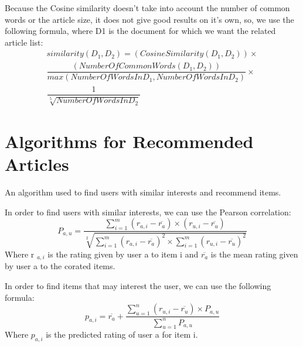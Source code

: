 \begin{enumerate}
		Because the Cosine similarity doesn’t take into account the number of common words or the article size, it does not give good results on it’s own, so, we use the following formula, where D1 is the document for which we want the related article list:
		\begin{equation}
			\begin{split}
				similarity(D_{1},D_{2}) = (Cosine Similarity(D_{1}, D_{2})) \times \\
				\dfrac {(Number Of Common Words(D_{1}, D_{2}))} {max(Number Of Words In D_{1}, Number Of Words In D_{2})} \times \\
				\dfrac {1} {\sqrt[5] {Number Of Words In D_{2}}}
			\end{split}
		\end{equation}

\end{enumerate}


\section{Algorithms for Recommended Articles}
\label{sec:algorithms-for-recommended-articles}

An algorithm used to find users with similar interests and recommend items.

In order to find users with similar interests, we can use the Pearson correlation:
\begin{equation}
	P_{a,u} = \dfrac {\sum_{i=1}^{m}(r_{a,i} - \overline{r_{a}})\times(r_{u,i} - \overline{r_{u}})}{\sqrt[2]{\sum_{i=1}^{m}(r_{a,i} - \overline{r_{a}})^{2}\times \sum_{i=1}^{m}(r_{u,i} - \overline{r_{u}})^{2}}}
\end{equation}
Where r $_{a,i}$ is the rating given by user a to item i and $\overline{r_{a}}$ is the mean rating given by user a to the corated items.

In order to find items that may interest the user, we can use the following formula:
 \begin{equation}
 	p_{a,i} = \overline {r_{a}} + \dfrac{\sum_{u=1}^{n} (r_{u,i} - \overline{r_{u}}) \times P_{a,u}}{\sum_{u=1}^{n} P_{a,u}} 
 \end{equation}
Where $p_{a,i}$ is the predicted rating of user a for item i.
